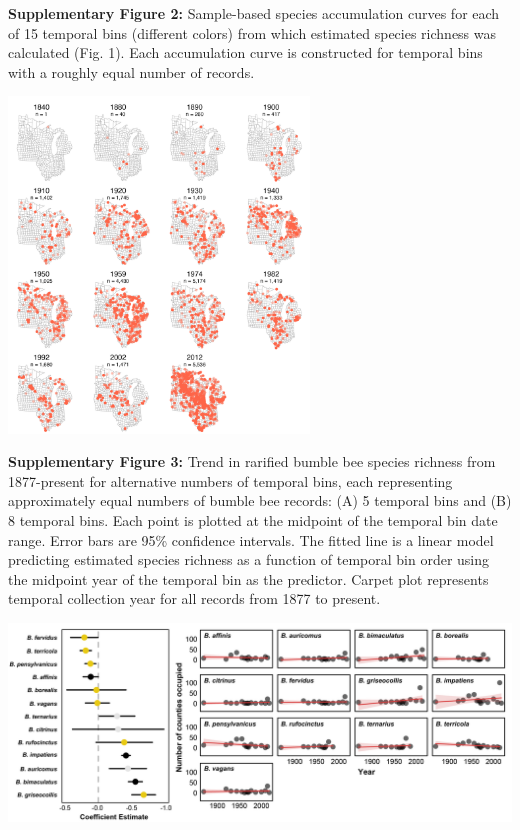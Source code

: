 \documentclass[11pt,]{article}
\begin{document}
\textbf{Supplementary Figure 2:} Sample-based species accumulation
curves for each of 15 temporal bins (different colors) from which
estimated species richness was calculated (Fig. 1). Each accumulation
curve is constructed for temporal bins with a roughly equal number of
records.

\clearpage

\newpage

\includegraphics[width=0.6\textwidth,height=\textheight]{../ms_figs/fig_s1.png}

\textbf{Supplementary Figure 3:} Trend in rarified bumble bee species
richness from 1877-present for alternative numbers of temporal bins,
each representing approximately equal numbers of bumble bee records: (A)
5 temporal bins and (B) 8 temporal bins. Each point is plotted at the
midpoint of the temporal bin date range. Error bars are 95\% confidence
intervals. The fitted line is a linear model predicting estimated
species richness as a function of temporal bin order using the midpoint
year of the temporal bin as the predictor. Carpet plot represents
temporal collection year for all records from 1877 to present.

\clearpage

\newpage

\includegraphics[width=1\textwidth,height=\textheight]{../ms_figs/fig6.png}
\end{document}
